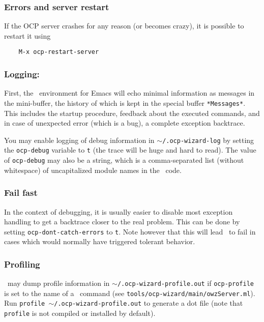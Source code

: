 \subsubsection{Errors and server restart}

If the OCP server crashes for any reason (or becomes crazy), it is
possible to restart it using
{\verbsize\begin{verbatim}
    M-x ocp-restart-server
\end{verbatim}}

\subsubsection{Logging:}

First, the \typerex\ environment for Emacs will echo minimal
information as messages in the mini-buffer, the history of
which is kept in the special buffer \verb!*Messages*!. This includes
the startup procedure, feedback about the executed commands, and in
case of unexpected error (which is a bug), a complete exception backtrace.

You may enable logging of debug information in
$\sim$\verb!/.ocp-wizard-log! by setting the \verb!ocp-debug! variable to
\verb!t! (the trace will be huge and hard to read).  The value of
\verb!ocp-debug! may also be a string, which is a comma-separated list
(without whitespace) of uncapitalized module names in the \typerex\
code.

\subsubsection{Fail fast}
In the context of debugging, it is usually easier to disable most
exception handling to get a backtrace closer to the real problem. This
can be done by setting \verb!ocp-dont-catch-errors! to \verb!t!. Note
however that this will lead \typerex\ to fail in cases which would
normally have triggered tolerant behavior.

\subsubsection{Profiling}

\typerex\ may dump profile information in
$\sim$\verb!/.ocp-wizard-profile.out! if \verb!ocp-profile! is set to
the name of a \typerex\ command (see
\verb!tools/ocp-wizard/main/owzServer.ml!). Run
\verb!profile !$\sim$\verb!/.ocp-wizard-profile.out! to generate a dot file (note
that \verb!profile! is not compiled or installed by default).
